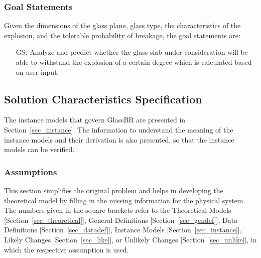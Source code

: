 \documentclass[12pt]{article}
\newcounter{goalnum} %
\newcommand{\progname}{GlassBR}
\begin{document}
\subsubsection{Goal Statements}\label{sec_gs} 

Given the dimensions of the glass plane, glass type, the characteristics of the explosion, and
the tolerable probability of breakage, the goal statements are:
\begin{itemize}
\item[GS\refstepcounter{goalnum}\thegoalnum: \label{GS_Safe}] Analyze and predict whether the
  glass slab under consideration will be able to withstand the explosion of a
  certain degree which is calculated based on user input.
\end{itemize}  

\subsection{Solution Characteristics Specification}

The instance models that govern \progname{} are presented in Section~\ref{sec_instance}. The information
to understand the meaning of the instance models and their derivation is also presented, so
that the instance models can be verified.

\subsubsection{Assumptions} \label{Assumptions}

This section simplifies the original problem and helps in developing the
theoretical model by filling in the missing information for the physical
system. The numbers given in the square brackets refer to the Theoretical 
Models [Section~\ref{sec_theoretical}], General Definitions 
[Section~\ref{sec_gendef}], Data Definitions [Section~\ref{sec_datadef}], Instance
Models [Section~\ref{sec_instance}], Likely Changes [Section~\ref{sec_like}],
or Unlikely Changes [Section~\ref{sec_unlike}], in which the respective 
assumption is used.
\end{document}

